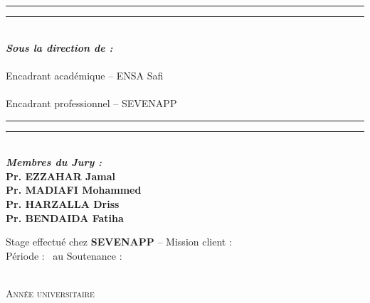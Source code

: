 \begin{titlepage}
\begin{minipage}[t]{0.47\textwidth}
{\color{titleyellow}\rule{0.16\textwidth}{0.7pt}\color{titlered}\rule{0.22\textwidth}{0.7pt}}\\[0.12cm]
\color{black}
{\bfseries\itshape Sous la direction de :}\\[0.16cm]
{\bfseries \EncadrantAcademique}\\
{\scriptsize Encadrant académique -- ENSA Safi}\\[0.18cm]
{\bfseries \EncadrantPro}\\
{\scriptsize Encadrant professionnel -- SEVENAPP}
\end{minipage}
\hfill
\begin{minipage}[t]{0.39\textwidth}
\raggedleft
{\color{titlered}\rule{0.22\textwidth}{0.7pt}\color{titleyellow}\rule{0.16\textwidth}{0.7pt}}\\[0.12cm]
\color{black}
{\bfseries\itshape Membres du Jury :}\\[0.16cm]
{\bfseries Pr. EZZAHAR Jamal}\\
{\bfseries Pr. MADIAFI Mohammed}\\
{\bfseries Pr. HARZALLA Driss}\\
{\bfseries Pr. BENDAIDA Fatiha}
\end{minipage}

\vfill

\begin{center}
\colorbox{lightpanel}{%
\begin{minipage}{0.76\textwidth}
  \centering\small
  Stage effectué chez \textbf{SEVENAPP} -- Mission client : \textbf{\ClientMission}\\[0.08cm]
  Période : \DateDebutStage\ au \DateFinStage
  \quad \textbullet \quad
  Soutenance : \DateSoutenance
\end{minipage}}\\[0.24cm]
{\small\scshape Année universitaire \AnneeUniv}
\end{center}

\endgroup
\end{titlepage}
\clearpage
